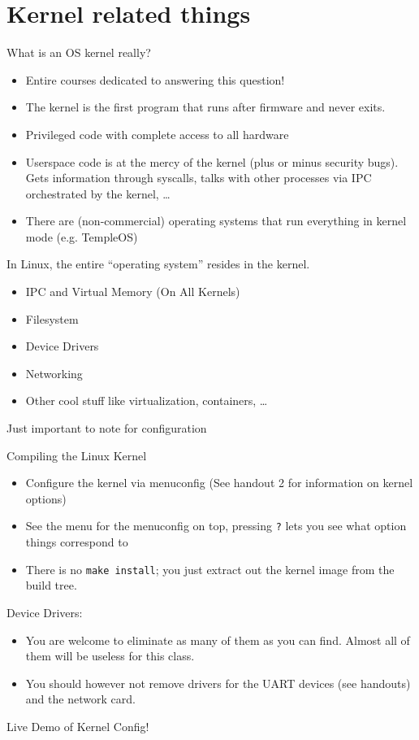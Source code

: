 \documentclass{../lecture}
\begin{document}
\section{Kernel related things}

\begin{frame}{What is an OS kernel really?}
  \begin{itemize}
    \item Entire courses dedicated to answering this question!
    \item The kernel is the first program that runs after firmware and never exits.
    \item Privileged code with complete access to all hardware
    \item Userspace code is at the mercy of the kernel (plus or minus security
      bugs). Gets information through syscalls, talks with other processes via
      IPC orchestrated by the kernel, \dots
    \item There are (non-commercial) operating systems that run everything in
      kernel mode (e.g. TempleOS)
  \end{itemize}
  In Linux, the entire ``operating system'' resides in the kernel.
  \begin{itemize}
    \item IPC and Virtual Memory (On All Kernels)
    \item Filesystem
    \item Device Drivers
    \item Networking
    \item Other cool stuff like virtualization, containers, \dots
  \end{itemize}
  Just important to note for configuration
\end{frame}

\begin{frame}{Compiling the Linux Kernel}
  \begin{itemize}
    \item Configure the kernel via menuconfig (See handout 2 for information on
      kernel options)
    \item See the menu for the menuconfig on top, pressing \texttt{?} lets you see what option
      things correspond to
    \item There is no \texttt{make install}; you just extract out the kernel
      image from the build tree.
  \end{itemize}
  Device Drivers:
  \begin{itemize}
    \item You are welcome to eliminate as many of them as you can find. Almost
      all of them will be useless for this class.
    \item You should however not remove drivers for the UART devices (see
      handouts) and the network card.
  \end{itemize}
  Live Demo of Kernel Config!
\end{frame}
\end{document}
